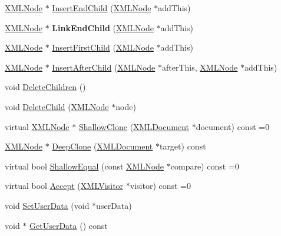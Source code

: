 \begin{DoxyCompactItemize}
\item 
\hyperlink{classtinyxml2_1_1XMLNode}{X\+M\+L\+Node} $\ast$ \hyperlink{classtinyxml2_1_1XMLNode_ae3b422e98914d6002ca99bb1d2837103}{Insert\+End\+Child} (\hyperlink{classtinyxml2_1_1XMLNode}{X\+M\+L\+Node} $\ast$add\+This)
\item 
\hyperlink{classtinyxml2_1_1XMLNode}{X\+M\+L\+Node} $\ast$ {\bfseries Link\+End\+Child} (\hyperlink{classtinyxml2_1_1XMLNode}{X\+M\+L\+Node} $\ast$add\+This)\hypertarget{classtinyxml2_1_1XMLNode_a663e3a5a378169fd477378f4d17a7649}{}\label{classtinyxml2_1_1XMLNode_a663e3a5a378169fd477378f4d17a7649}

\item 
\hyperlink{classtinyxml2_1_1XMLNode}{X\+M\+L\+Node} $\ast$ \hyperlink{classtinyxml2_1_1XMLNode_ac609a8f3ea949027f439280c640bbaf2}{Insert\+First\+Child} (\hyperlink{classtinyxml2_1_1XMLNode}{X\+M\+L\+Node} $\ast$add\+This)
\item 
\hyperlink{classtinyxml2_1_1XMLNode}{X\+M\+L\+Node} $\ast$ \hyperlink{classtinyxml2_1_1XMLNode_a9275138a1b8dd5d8e2c26789bdc23ac8}{Insert\+After\+Child} (\hyperlink{classtinyxml2_1_1XMLNode}{X\+M\+L\+Node} $\ast$after\+This, \hyperlink{classtinyxml2_1_1XMLNode}{X\+M\+L\+Node} $\ast$add\+This)
\item 
void \hyperlink{classtinyxml2_1_1XMLNode_a0360085cc54df5bff85d5c5da13afdce}{Delete\+Children} ()
\item 
void \hyperlink{classtinyxml2_1_1XMLNode_a363b6edbd6ebd55f8387d2b89f2b0921}{Delete\+Child} (\hyperlink{classtinyxml2_1_1XMLNode}{X\+M\+L\+Node} $\ast$node)
\item 
virtual \hyperlink{classtinyxml2_1_1XMLNode}{X\+M\+L\+Node} $\ast$ \hyperlink{classtinyxml2_1_1XMLNode_a8402cbd3129d20e9e6024bbcc0531283}{Shallow\+Clone} (\hyperlink{classtinyxml2_1_1XMLDocument}{X\+M\+L\+Document} $\ast$document) const =0
\item 
\hyperlink{classtinyxml2_1_1XMLNode}{X\+M\+L\+Node} $\ast$ \hyperlink{classtinyxml2_1_1XMLNode_aac9830f503ff38b6f9f7ea7f48b8adee}{Deep\+Clone} (\hyperlink{classtinyxml2_1_1XMLDocument}{X\+M\+L\+Document} $\ast$target) const 
\item 
virtual bool \hyperlink{classtinyxml2_1_1XMLNode_a7ce18b751c3ea09eac292dca264f9226}{Shallow\+Equal} (const \hyperlink{classtinyxml2_1_1XMLNode}{X\+M\+L\+Node} $\ast$compare) const =0
\item 
virtual bool \hyperlink{classtinyxml2_1_1XMLNode_a81e66df0a44c67a7af17f3b77a152785}{Accept} (\hyperlink{classtinyxml2_1_1XMLVisitor}{X\+M\+L\+Visitor} $\ast$visitor) const =0
\item 
void \hyperlink{classtinyxml2_1_1XMLNode_a002978fc889cc011d143185f2377eca2}{Set\+User\+Data} (void $\ast$user\+Data)
\item 
void $\ast$ \hyperlink{classtinyxml2_1_1XMLNode_aa4442e68dca53c3f339238101ea55e30}{Get\+User\+Data} () const 
\end{DoxyCompactItemize}
